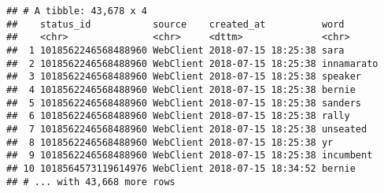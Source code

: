 \documentclass[]{article}
\newenvironment{Shaded}{\begin{snugshade}}{\end{snugshade}}
\newcommand{\CharTok}[1]{\textcolor[rgb]{0.31,0.60,0.02}{#1}}
\newcommand{\CommentTok}[1]{\textcolor[rgb]{0.56,0.35,0.01}{\textit{#1}}}
\newcommand{\DataTypeTok}[1]{\textcolor[rgb]{0.13,0.29,0.53}{#1}}
\newcommand{\KeywordTok}[1]{\textcolor[rgb]{0.13,0.29,0.53}{\textbf{#1}}}
\newcommand{\NormalTok}[1]{#1}
\newcommand{\OperatorTok}[1]{\textcolor[rgb]{0.81,0.36,0.00}{\textbf{#1}}}
\newcommand{\StringTok}[1]{\textcolor[rgb]{0.31,0.60,0.02}{#1}}
\begin{document}
\begin{Shaded}
\end{Shaded}

\begin{verbatim}
## # A tibble: 43,678 x 4
##    status_id           source    created_at          word      
##    <chr>               <chr>     <dttm>              <chr>     
##  1 1018562246568488960 WebClient 2018-07-15 18:25:38 sara      
##  2 1018562246568488960 WebClient 2018-07-15 18:25:38 innamarato
##  3 1018562246568488960 WebClient 2018-07-15 18:25:38 speaker   
##  4 1018562246568488960 WebClient 2018-07-15 18:25:38 bernie    
##  5 1018562246568488960 WebClient 2018-07-15 18:25:38 sanders   
##  6 1018562246568488960 WebClient 2018-07-15 18:25:38 rally     
##  7 1018562246568488960 WebClient 2018-07-15 18:25:38 unseated  
##  8 1018562246568488960 WebClient 2018-07-15 18:25:38 yr        
##  9 1018562246568488960 WebClient 2018-07-15 18:25:38 incumbent 
## 10 1018564573119614976 WebClient 2018-07-15 18:34:52 bernie    
## # ... with 43,668 more rows
\end{verbatim}
\end{document}
